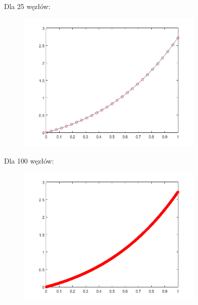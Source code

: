\begin{samepage}
	Dla 25 węzłów:
	\begin{figure}[!ht]
		\begin{center}
			\includegraphics[width=0.8\textwidth]{Lab4/charts/zad4/3/25.png}
		\end{center}
	\end{figure}
	\FloatBarrier
\end{samepage}

\newpage
\begin{samepage}
	
	Dla 100 węzłów:
	\begin{figure}[!ht]
		\begin{center}
			\includegraphics[width=0.8\textwidth]{Lab4/charts/zad4/3/100.png}
		\end{center}
	\end{figure}
	\FloatBarrier
\end{samepage}

